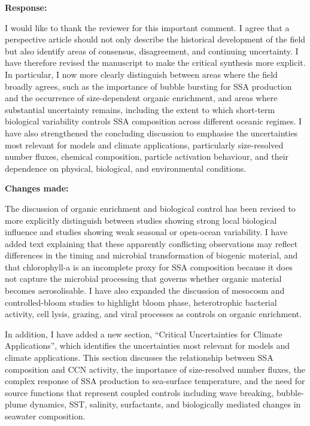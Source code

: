 \documentclass[11pt]{article}
\begin{document}
\textbf{Response:}

I would like to thank the reviewer for this important comment. I agree that a perspective article should not only describe the historical development of the field but also identify areas of consensus, disagreement, and continuing uncertainty. I have therefore revised the manuscript to make the critical synthesis more explicit. In particular, I now more clearly distinguish between areas where the field broadly agrees, such as the importance of bubble bursting for SSA production and the occurrence of size-dependent organic enrichment, and areas where substantial uncertainty remains, including the extent to which short-term biological variability controls SSA composition across different oceanic regimes. I have also strengthened the concluding discussion to emphasise the uncertainties most relevant for models and climate applications, particularly size-resolved number fluxes, chemical composition, particle activation behaviour, and their dependence on physical, biological, and environmental conditions.

\textbf{Changes made:}

The discussion of organic enrichment and biological control has been revised to more explicitly distinguish between studies showing strong local biological influence and studies showing weak seasonal or open-ocean variability. I have added text explaining that these apparently conflicting observations may reflect differences in the timing and microbial transformation of biogenic material, and that chlorophyll-a is an incomplete proxy for SSA composition because it does not capture the microbial processing that governs whether organic material becomes aerosolisable. I have also expanded the discussion of mesocosm and controlled-bloom studies to highlight bloom phase, heterotrophic bacterial activity, cell lysis, grazing, and viral processes as controls on organic enrichment.

In addition, I have added a new section, ``Critical Uncertainties for Climate Applications'', which identifies the uncertainties most relevant for models and climate applications. This section discusses the relationship between SSA composition and CCN activity, the importance of size-resolved number fluxes, the complex response of SSA production to sea-surface temperature, and the need for source functions that represent coupled controls including wave breaking, bubble-plume dynamics, SST, salinity, surfactants, and biologically mediated changes in seawater composition.
\end{document}

